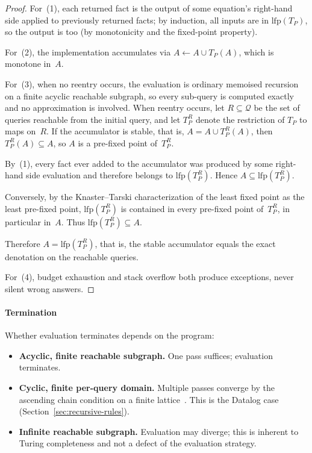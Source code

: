 \begin{proof}
  For~(1), each returned fact is the output of some
  equation's right-hand side applied to previously
  returned facts; by induction, all inputs are in
  $\mathrm{lfp}(T_P)$, so the output is too (by
  monotonicity and the fixed-point property).

  For~(2), the implementation accumulates via
  $A \leftarrow A \cup T_P(A)$, which is monotone in~$A$.

  For~(3), when no reentry occurs, the evaluation is
  ordinary memoised recursion on a finite acyclic
  reachable subgraph, so every sub-query is computed
  exactly and no approximation is involved.
  When reentry occurs, let $R \subseteq \mathcal{Q}$ be
  the set of queries reachable from the initial query,
  and let $T_P^R$ denote the restriction of $T_P$ to
  maps on~$R$.
  If the accumulator is stable, that is,
  $A = A \cup T_P^R(A)$, then
  $T_P^R(A) \subseteq A$, so $A$ is a pre-fixed point
  of~$T_P^R$.

  By~(1), every fact ever added to the accumulator was
  produced by some right-hand side evaluation and
  therefore belongs to $\mathrm{lfp}(T_P^R)$.
  Hence $A \subseteq \mathrm{lfp}(T_P^R)$.

  Conversely, by the Knaster--Tarski characterization
  of the least fixed point as the least pre-fixed
  point, $\mathrm{lfp}(T_P^R)$ is contained in every
  pre-fixed point of~$T_P^R$, in particular in~$A$.
  Thus $\mathrm{lfp}(T_P^R) \subseteq A$.

  Therefore $A = \mathrm{lfp}(T_P^R)$, that is, the stable
  accumulator equals the exact denotation on the
  reachable queries.

  For~(4), budget exhaustion and stack overflow both
  produce exceptions, never silent wrong answers.
\end{proof}

\paragraph{Termination}
Whether evaluation terminates depends on the
program:
\begin{itemize}
  \item \textbf{Acyclic, finite reachable subgraph.}
    One pass suffices; evaluation terminates.
  \item \textbf{Cyclic, finite per-query domain.}
    Multiple passes converge by the ascending chain
    condition on a finite
    lattice~\cite{bancilhon1986-recursive-query-strategies}.
    This is the Datalog case
    (Section~\ref{sec:recursive-rules}).
  \item \textbf{Infinite reachable subgraph.}
    Evaluation may diverge; this is inherent to
    Turing completeness and not a defect of the
    evaluation strategy.
\end{itemize}

